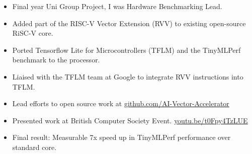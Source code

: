 {
  {\begin{itemize}
    \item Final year Uni Group Project, I was Hardware Benchmarking Lead.
    \item Added part of the RISC-V Vector Extension (RVV) to existing open-source RiSC-V core.
    \item Ported Tensorflow Lite for Microcontrollers (TFLM) and the TinyMLPerf benchmark to the processor.
    \item Liaised with the TFLM team at Google to integrate RVV instructions into TFLM. 
    \item Lead efforts to open source work at \url{github.com/AI-Vector-Accelerator}
    \item Presented work at British Computer Society Event. \url{youtu.be/t0Fpy4TzLUE}
    \item Final result: Measurable 7x speed up in TinyMLPerf performance over standard core.
  \end{itemize} 
  }
}
